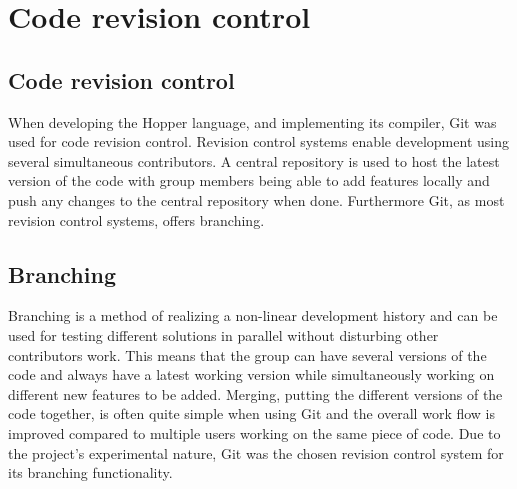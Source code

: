 \section{Code revision control}


\subsection{Code revision control}


When developing the Hopper language, and implementing its compiler, Git was used for code revision control.
Revision control systems enable development using several simultaneous contributors.
A central repository is used to host the latest version of the code with group members
being able to add features locally and push any changes to the central repository when done.  
Furthermore Git, as most revision control systems, offers branching. 

\subsection{Branching}

Branching is a method of realizing a non-linear development history and can be used for 
testing different solutions in parallel without disturbing other contributors work.
This means that the group can have several versions of the code and always have a
latest working version while simultaneously working on different new features
to be added. Merging, putting the different versions of the code together, is often
quite simple when using Git and the overall work flow is improved compared to
multiple users working on the same piece of code. 
Due to the project's experimental nature, Git was the chosen revision control system 
for its branching functionality.


